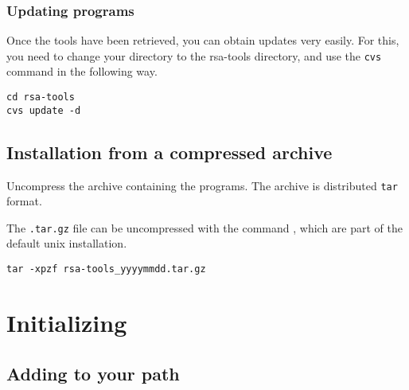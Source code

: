 \documentclass{book}
\begin{document}
\subsection{Updating \RSAT programs}

Once the tools have been retrieved, you can obtain updates very
easily. For this, you need to change your directory to the rsa-tools
directory, and use the \texttt{cvs} command in the following way.

\begin{footnotesize}
\begin{verbatim}
cd rsa-tools
cvs update -d
\end{verbatim}
\end{footnotesize}



\section{Installation from a compressed archive}

Uncompress the archive containing the programs. The archive is
distributed \texttt{tar} format.

The \texttt{.tar.gz} file can be uncompressed with the command
, which are part of the default unix installation.

\begin{footnotesize}
\begin{verbatim}
tar -xpzf rsa-tools_yyyymmdd.tar.gz
\end{verbatim}
\end{footnotesize}

\chapter{Initializing \RSAT}

\section{Adding \RSAT to your path}
\end{document}
